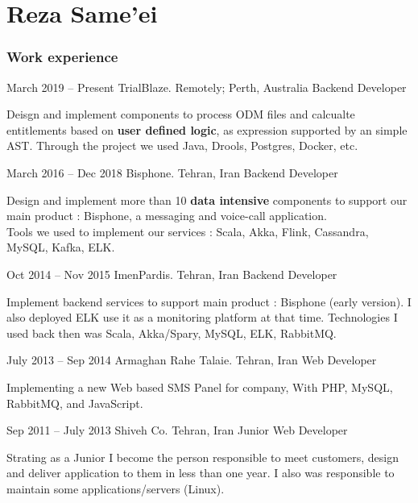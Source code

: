 \documentclass{tccv}
\begin{document}
\part{Reza Same'ei}

\section{Work experience}

\begin{eventlist}

\item{March 2019 -- Present}
     {TrialBlaze. Remotely; Perth, Australia}
     {Backend Developer}

    Deisgn and implement components to process ODM files and calcualte entitlements based on \textbf{user defined logic}, as expression supported by an simple AST. Through the project we used Java, Drools, Postgres, Docker, etc.

\item{March 2016 -- Dec 2018}
     {Bisphone. Tehran, Iran}
     {Backend Developer}

    Design and implement more than 10 \textbf{data intensive} components to support our main product : Bisphone, a messaging and voice-call application.\\Tools we used to implement our services : Scala, Akka, Flink, Cassandra, MySQL, Kafka, ELK.

\item{Oct 2014 -- Nov 2015}
     {ImenPardis. Tehran, Iran}
     {Backend Developer}

    Implement backend services to support main product : Bisphone (early version). I also deployed ELK use it as a monitoring platform at that time. Technologies I used back then was Scala, Akka/Spary, MySQL, ELK, RabbitMQ.

\item{July 2013 -- Sep 2014}
     {Armaghan Rahe Talaie. Tehran, Iran}
     {Web Developer}

    Implementing a new Web based SMS Panel for company, With PHP, MySQL, RabbitMQ, and JavaScript.

\item{Sep 2011 -- July 2013}
     {Shiveh Co. Tehran, Iran}
     {Junior Web Developer}

    Strating as a Junior I become the person responsible to meet customers, design and deliver application to them in less than one year. I also was responsible to maintain some applications/servers (Linux).

\end{eventlist}
\end{document}
